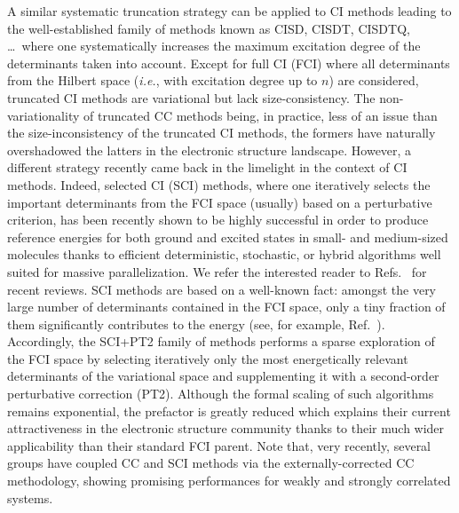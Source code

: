 \documentclass[aip,jcp,reprint,noshowkeys,superscriptaddress,floatfix]{revtex4-1}
\newcommand{\ie}{\textit{i.e.}}
\newcommand{\Nel}{n}
\begin{document}
A similar systematic truncation strategy can be applied to CI methods leading to the well-established family of methods known as CISD, CISDT, CISDTQ, \ldots~where one systematically increases the maximum excitation degree of the determinants taken into account.
Except for full CI (FCI) where all determinants from the Hilbert space (\ie, with excitation degree up to $\Nel$) are considered, truncated CI methods are variational but lack size-consistency.
The non-variationality of truncated CC methods being, in practice, less of an issue than the size-inconsistency of the truncated CI methods, the formers have naturally overshadowed the latters in the electronic structure landscape.
However, a different strategy recently came back in the limelight in the context of CI methods. \cite{Bender_1969,Whitten_1969,Huron_1973,Shih_1978,Buenker_1978,Evangelisti_1983,Cimiraglia_1985,Cimiraglia_1987,Illas_1988,Povill_1992,Abrams_2005,Bunge_2006}
Indeed, selected CI (SCI) methods, \cite{Booth_2009,Giner_2013,Evangelista_2014,Giner_2015,Caffarel_2016b,Holmes_2016,Tubman_2016,Liu_2016,Ohtsuka_2017,Zimmerman_2017,Coe_2018,Garniron_2018} where one iteratively selects the important determinants from the FCI space (usually) based on a perturbative criterion, has been recently shown to be highly successful in order to produce reference energies for both ground and excited states in small- and medium-sized molecules \cite{Caffarel_2014,Caffarel_2016a,Scemama_2016,Holmes_2017,Li_2018,Scemama_2018,Scemama_2018b,Li_2020,Loos_2018a,Chien_2018,Loos_2019,Loos_2020b,Loos_2020c,Loos_2020e,Garniron_2019,Eriksen_2020,Yao_2020,Williams_2020,Veril_2021,Loos_2021} thanks to efficient deterministic, stochastic, or hybrid algorithms well suited for massive parallelization.
We refer the interested reader to Refs.~ for recent reviews.
SCI methods are based on a well-known fact: amongst the very large number of determinants contained in the FCI space, only a tiny fraction of them significantly contributes to the energy (see, for example, Ref.~).
Accordingly, the SCI+PT2 family of methods performs a sparse exploration of the FCI space by selecting iteratively only the most energetically relevant determinants of the variational space and supplementing it with a second-order perturbative correction (PT2). \cite{Huron_1973,Garniron_2017,Sharma_2017,Garniron_2018,Garniron_2019}
Although the formal scaling of such algorithms remains exponential, the prefactor is greatly reduced which explains their current attractiveness in the electronic structure community thanks to their much wider applicability than their standard FCI parent.
Note that, very recently, several groups \cite{Aroeira_2021,Lee_2021,Magoulas_2021} have coupled CC and SCI methods via the externally-corrected CC methodology, \cite{Paldus_2017} showing promising performances for weakly and strongly correlated systems.
\end{document}
